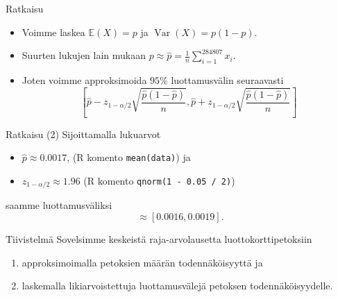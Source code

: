 \documentclass{beamer}
\DeclareMathOperator{\var}{Var}
\begin{document}
\begin{frame}{Ratkaisu}
  \begin{itemize}
    \item Voimme laskea $\mathbb{E}\left(X\right) = p$ ja $\var\left(X\right) =
    p(1-p)$.
    \item Suurten lukujen lain mukaan $p \approx \hat p =
    \frac{1}{n}\sum_{i=1}^{284807} x_i$.
    \item Joten voimme approksimoida $95\%$ luottamusvälin seuraavasti
    \begin{equation*}
      \left[\hat p - z_{1 - \alpha/2}\sqrt{\frac{\hat p(1-\hat p)}{n}},
      \hat p + z_{1 - \alpha/2}\sqrt{\frac{\hat p(1-\hat p)}{n}}\right]
    \end{equation*}
  \end{itemize}
\end{frame}


\begin{frame}{Ratkaisu (2)}
  Sijoittamalla lukuarvot
  \begin{itemize}
    \item $\hat p\approx 0.0017$, (\textsf{R} komento \texttt{mean(data)}) ja
    \item $z_{1 - \alpha / 2} \approx 1.96$ (\textsf{R} komento \texttt{qnorm(1
    - 0.05 / 2)})
  \end{itemize}
  saamme luottamusväliksi
  \begin{equation*}
    \approx \left[0.0016, 0.0019\right].
  \end{equation*}
\end{frame}

\begin{frame}{Tiivistelmä}
  Sovelsimme keskeistä raja-arvolausetta luottokorttipetoksiin
  \begin{enumerate}
    \item approksimoimalla petoksien määrän todennäköisyyttä ja
    \item laskemalla likiarvoistettuja luottamusvälejä petoksen
    todennäköisyydelle.
  \end{enumerate}
\end{frame}
\end{document}

